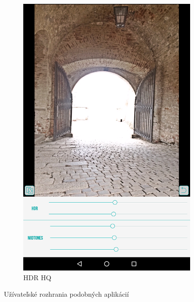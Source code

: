 \begin{figure}[t]
\begin{subfigure}{0.4\textwidth}
        \includegraphics[width=\textwidth]{figures/ui/apps/uiHdrHq}
        \caption{HDR HQ}
        \label{fig:appsUI_2}
    \end{subfigure}
    \caption{Užívateľské rozhrania podobných aplikácií}
    \label{fig:appsUI}
  \end{figure}